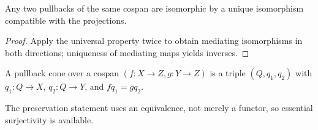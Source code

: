 \begin{corollary}
Any two pullbacks of the same cospan are isomorphic by a unique isomorphism compatible with the projections.
\end{corollary}
\begin{proof}
Apply the universal property twice to obtain mediating isomorphisms in both directions; uniqueness of mediating maps yields inverses.
\end{proof}

\begin{definition}
A pullback cone over a cospan $(f : X \to Z, g : Y \to Z)$ is a triple $(Q, q_1, q_2)$ with $q_1 : Q \to X$, $q_2 : Q \to Y$, and $f q_1 = g q_2$.
\end{definition}

\begin{remark}
The preservation statement uses an equivalence, not merely a functor, so essential surjectivity is available.
\end{remark}
